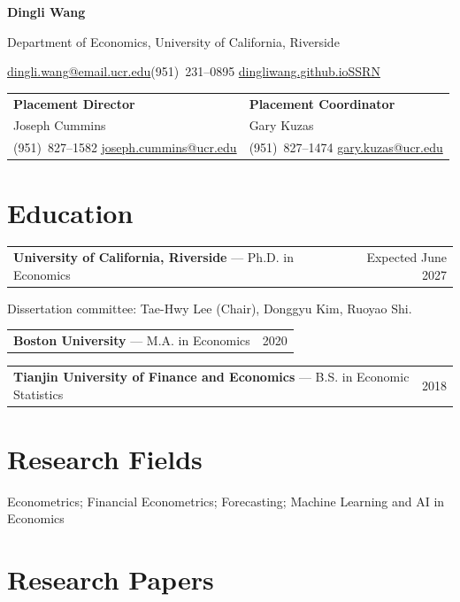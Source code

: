 \documentclass[11pt,letterpaper]{article}
\makeatletter
\newcommand{\cvrow}[2]{\begin{tabularx}{\textwidth}{@{}Xr@{}}#1&#2\end{tabularx}\par}
\makeatother
\begin{document}
\thispagestyle{plain}
{\fontsize{25}{28}\selectfont\bfseries Dingli Wang}\par
\vspace{3pt}
Department of Economics, University of California, Riverside\par
\href{mailto:dingli.wang@email.ucr.edu}{dingli.wang@email.ucr.edu}\quad\textbar\quad (951)~231--0895\quad\textbar\quad
\href{https://dingliwang.github.io/}{dingliwang.github.io}\quad\textbar\quad\href{https://ssrn.com/author=10994248}{SSRN}

\vspace{7pt}
{\small
\begin{tabularx}{\textwidth}{@{}X X@{}}
\textbf{Placement Director} & \textbf{Placement Coordinator}\\
Joseph Cummins & Gary Kuzas\\
(951)~827--1582 \quad \href{mailto:joseph.cummins@ucr.edu}{joseph.cummins@ucr.edu} &
(951)~827--1474 \quad \href{mailto:gary.kuzas@ucr.edu}{gary.kuzas@ucr.edu}
\end{tabularx}}

\section{Education}
\cvrow{\textbf{University of California, Riverside} --- Ph.D. in Economics}{Expected June 2027}
{\small Dissertation committee: Tae-Hwy Lee (Chair), Donggyu Kim, Ruoyao Shi.}\par
\vspace{3pt}
\cvrow{\textbf{Boston University} --- M.A. in Economics}{2020}
\vspace{3pt}
\cvrow{\textbf{Tianjin University of Finance and Economics} --- B.S. in Economic Statistics}{2018}

\section{Research Fields}
Econometrics; Financial Econometrics; Forecasting; Machine Learning and AI in Economics

\section{Research Papers}
\end{document}
